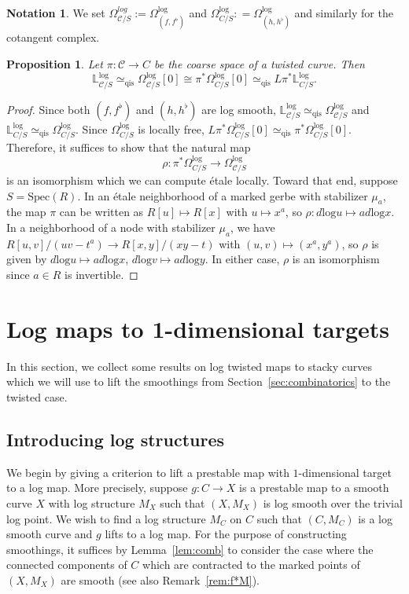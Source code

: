 \documentclass[11pt]{amsart}
\numberwithin{equation}{section}
\newtheorem{proposition}[theorem]{Proposition}
\theoremstyle{definition}
\newtheorem{notat}[theorem]{Notation}
\theoremstyle{remark}
\newcommand{\bLl}{\mathbb L^{\mathrm{log}}}
\newcommand{\calC}{\mathcal C}
\newcommand{\Spec}{\mathrm{Spec}}
\renewcommand{\log}{\mathrm{log}}
\newcommand{\qis}{\mathrm{qis}}
\begin{document}
\begin{notat} We set $\Omega^{log}_{\calC/S} := \Omega^{\log}_{(f,f^\flat)}$ and $\Omega^{\log}_{C/S} : = \Omega^{\log}_{(h,h^\flat)}$ and similarly for the cotangent complex.
\end{notat}


\begin{proposition}
Let $\pi\colon  \calC \to C$ be the coarse space of a twisted curve. Then 
\[
\bLl_{\calC/S} \simeq_{\qis} \Omega^{\log}_{\calC/S}[0] \cong \pi^*\Omega^{\log}_{C/S}[0] \simeq_{\qis} L\pi^*\bLl_{C/S}.
\]

\end{proposition} 

\begin{proof} Since both $(f,f^\flat)$ and $(h,h^\flat)$ are log smooth,  $\bLl_{\calC/S} \simeq_{\qis} \Omega^{\log}_{\calC/S}$ and $\bLl_{C/S}\simeq_{\qis} \Omega^{\log}_{C/S}$. Since $\Omega^{\log}_{C/S}$ is locally free, $L\pi^*\Omega^{\log}_{C/S}[0] \simeq_{\qis} \pi^*\Omega^{\log}_{C/S}[0]$. Therefore, it suffices to show that the natural map
$$
\rho \colon  \pi^*\Omega^{\log}_{C/S} \to \Omega^{\log}_{\calC/S}
$$
is an isomorphism which we can compute \'etale locally. Toward that end, suppose $S = \Spec(R)$. In an \'etale neighborhood of a marked gerbe with  stabilizer $\mu_a$, the map $\pi$ can be written as $R[u] \mapsto R[x]$ with $u \mapsto x^a$, so $\rho \colon  d \log u \mapsto a d\log x$. In a neighborhood of a node with stabilizer $\mu_a$, we have $R[u,v]/(uv - t^a) \to R[x,y]/(xy - t)$ with $(u,v) \mapsto (x^a, y^a)$, so $\rho$ is given by $d\log u \mapsto a d\log x$, $d \log v \mapsto a d \log y$. In either case, $\rho$ is an isomorphism since $a \in R$ is invertible. 
\end{proof} 



\section{Log maps to 1-dimensional targets}

In this section, we collect some results on log twisted maps to stacky curves which we will use to lift the smoothings from Section~\ref{sec:combinatorics} to the twisted case.

\subsection{Introducing log structures}

We begin by giving a criterion to lift a prestable map with $1$-dimensional target to a log map. More precisely, suppose $g \colon  C \to X$ is a prestable map to a smooth curve $X$ with log structure $M_X$ such that $(X,M_X)$ is log smooth over the trivial log point. We wish to find a log structure $M_C$ on $C$ such that $(C,M_C)$ is a log smooth curve and $g$ lifts to a log map. For the purpose of constructing smoothings, it suffices by Lemma~\ref{lem:comb} to consider the case where the connected components of $C$ which are contracted to the marked points of $(X,M_X)$ are smooth (see also Remark~\ref{rem:f*M}). 
\end{document}
